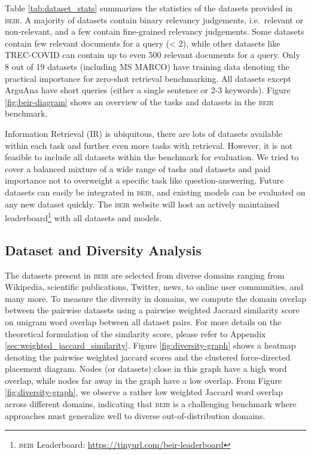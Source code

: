 \documentclass{article}
\newcommand{\custo}[1]{\textsc{\normalsize #1}}
\newcommand{\beir}{\custo{beir}\xspace}
\begin{document}
Table \ref{tab:dataset_stats} summarizes the statistics of the datasets provided in \beir. A majority of datasets contain binary relevancy judgements, i.e.\ relevant or non-relevant, and a few contain fine-grained relevancy judgements. Some datasets contain few relevant documents for a query (< 2), while other datasets like TREC-COVID \cite{10.1145/3451964.3451965} can contain up to even 500 relevant documents for a query. Only 8 out of 19 datasets (including MS MARCO) have training data denoting the practical importance for zero-shot retrieval benchmarking. All datasets except ArguAna \cite{wachsmuth:2018a} have short queries (either a single sentence or 2-3 keywords). Figure \ref{fig:beir-diagram} shows an overview of the tasks and datasets in the \beir benchmark.

Information Retrieval (IR) is ubiquitous, there are lots of datasets available within each task and further even more tasks with retrieval. However, it is not feasible to include all datasets within the benchmark for evaluation. We tried to cover a balanced mixture of a wide range of tasks and datasets and paid importance not to overweight a specific task like question-answering. Future datasets can  easily be integrated in \beir, and existing models can be evaluated on any new dataset quickly. The \beir website will host an actively maintained leaderboard\footnote{\beir Leaderboard: \href{https://tinyurl.com/beir-leaderboard}{https://tinyurl.com/beir-leaderboard}} with all datasets and models.

\vspace{-3mm}
\subsection{Dataset and Diversity Analysis}\label{sec:dataset-diversity}
\vspace{-1mm}

The datasets present in \beir are selected from diverse domains ranging from Wikipedia, scientific publications, Twitter, news, to online user communities, and many more. To measure the diversity in domains, we compute the domain overlap between the pairwise datasets using a pairwise weighted Jaccard similarity \cite{ioffe2010improved} score on unigram word overlap between all dataset pairs. For more details on the theoretical formulation of the similarity score, please refer to Appendix \ref{sec:weighted_jaccard_similarity}. Figure \ref{fig:diversity-graph} shows a heatmap denoting the pairwise weighted jaccard scores and the clustered force-directed placement diagram. Nodes (or datasets) close in this graph have a high word overlap, while nodes far away in the graph have a low overlap. From Figure \ref{fig:diversity-graph}, we observe a rather low weighted Jaccard word overlap across different domains, indicating that \beir is a challenging benchmark where approaches must generalize well to diverse out-of-distribution domains.
\end{document}
